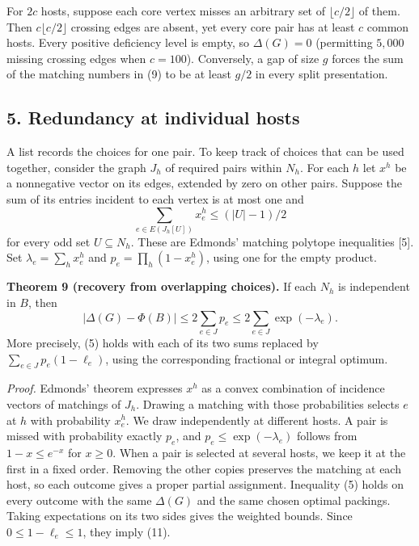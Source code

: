 \documentclass[english,11pt,a4paper]{article}
\begin{document}
For \(2c\) hosts, suppose each core vertex misses an arbitrary set of \(\lfloor c/2\rfloor\) of them. Then \(c\lfloor c/2\rfloor\) crossing edges are absent, yet every core pair has at least \(c\) common hosts. Every positive deficiency level is empty, so \(\Delta(G)=0\) (permitting \(5{,}000\) missing crossing edges when \(c=100\)). Conversely, a gap of size \(g\) forces the sum of the matching numbers in (9) to be at least \(g/2\) in every split presentation.

\subsection{5. Redundancy at individual hosts}\label{redundancy-at-individual-hosts}

A list records the choices for one pair. To keep track of choices that can be used together, consider the graph \(J_h\) of required pairs within \(N_h\). For each \(h\) let \(x^h\) be a nonnegative vector on its edges, extended by zero on other pairs. Suppose the sum of its entries incident to each vertex is at most one and \[
\sum_{e\in E(J_h[U])}x^h_e\le (|U|-1)/2
\] for every odd set \(U\subseteq N_h\). These are Edmonds' matching polytope inequalities {[}5{]}. Set \(\lambda_e=\sum_h x^h_e\) and \(p_e=\prod_h(1-x^h_e)\), using one for the empty product.

\textbf{Theorem 9 (recovery from overlapping choices).} If each \(N_h\) is independent in \(B\), then \[
|\Delta(G)-\Phi(B)|\le 2\sum_{e\in J}p_e
                  \le 2\sum_{e\in J}\exp(-\lambda_e). \tag{11}
\] More precisely, (5) holds with each of its two sums replaced by \(\sum_{e\in J}p_e(1-\ell_e)\), using the corresponding fractional or integral optimum.

\emph{Proof.} Edmonds' theorem expresses \(x^h\) as a convex combination of incidence vectors of matchings of \(J_h\). Drawing a matching with those probabilities selects \(e\) at \(h\) with probability \(x^h_e\). We draw independently at different hosts. A pair is missed with probability exactly \(p_e\), and \(p_e\le\exp(-\lambda_e)\) follows from \(1-x\le e^{-x}\) for \(x\ge0\). When a pair is selected at several hosts, we keep it at the first in a fixed order. Removing the other copies preserves the matching at each host, so each outcome gives a proper partial assignment. Inequality (5) holds on every outcome with the same \(\Delta(G)\) and the same chosen optimal packings. Taking expectations on its two sides gives the weighted bounds. Since \(0\le1-\ell_e\le1\), they imply (11).
\end{document}
